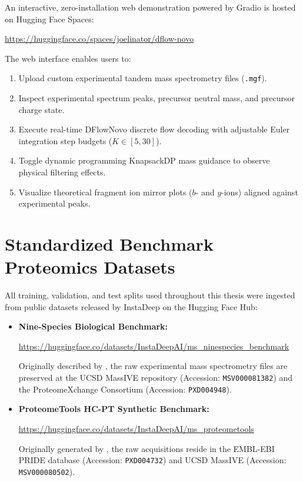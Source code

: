 An interactive, zero-installation web demonstration powered by Gradio is hosted on Hugging Face Spaces:
\begin{center}
\url{https://huggingface.co/spaces/joelinator/dflow-novo}
\end{center}

The web interface enables users to:
\begin{enumerate}
    \item Upload custom experimental tandem mass spectrometry files (\texttt{.mgf}).
    \item Inspect experimental spectrum peaks, precursor neutral mass, and precursor charge state.
    \item Execute real-time DFlowNovo discrete flow decoding with adjustable Euler integration step budgets ($K \in [5, 30]$).
    \item Toggle dynamic programming KnapsackDP mass guidance to observe physical filtering effects.
    \item Visualize theoretical fragment ion mirror plots ($b$- and $y$-ions) aligned against experimental peaks.
\end{enumerate}

\section{Standardized Benchmark Proteomics Datasets}

All training, validation, and test splits used throughout this thesis were ingested from public datasets released by InstaDeep on the Hugging Face Hub:
\begin{itemize}
    \item \textbf{Nine-Species Biological Benchmark:}
    \begin{center}
    \url{https://huggingface.co/datasets/InstaDeepAI/ms_ninespecies_benchmark}
    \end{center}
    Originally described by \citet{Tran2017}, the raw experimental mass spectrometry files are preserved at the UCSD MassIVE repository (Accession: \texttt{MSV000081382}) and the ProteomeXchange Consortium (Accession: \texttt{PXD004948}).
    \item \textbf{ProteomeTools HC-PT Synthetic Benchmark:}
    \begin{center}
    \url{https://huggingface.co/datasets/InstaDeepAI/ms_proteometools}
    \end{center}
    Originally generated by \citet{Zolg2017}, the raw acquisitions reside in the EMBL-EBI PRIDE database (Accession: \texttt{PXD004732}) and UCSD MassIVE (Accession: \texttt{MSV000080502}).
\end{itemize}

